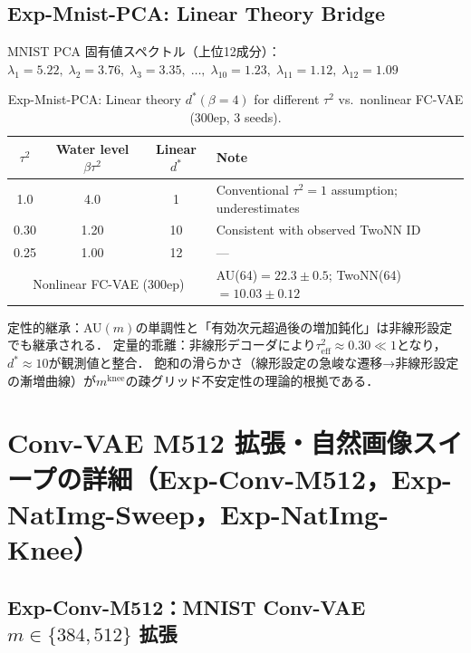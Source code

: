 \documentclass[11pt,a4paper]{jsarticle}
\newcommand{\mknee}{m^{\mathrm{knee}}}
\begin{document}
\subsection*{Exp-Mnist-PCA: Linear Theory Bridge}

MNIST PCA 固有値スペクトル（上位12成分）：
$\lambda_1=5.22,\; \lambda_2=3.76,\; \lambda_3=3.35,\;\ldots,\;\lambda_{10}=1.23,\; \lambda_{11}=1.12,\; \lambda_{12}=1.09$

\begin{table}[H]
\centering
\caption{Exp-Mnist-PCA: Linear theory $d^*(\beta=4)$ for different $\tau^2$ vs.\ nonlinear FC-VAE (300ep, 3 seeds).}
\label{tab:theory_pred}
\small
\begin{tabular}{ccc|l}
\toprule
$\tau^2$ & Water level $\beta\tau^2$ & Linear $d^*$ & Note \\
\midrule
1.0  & 4.0  & 1   & Conventional $\tau^2=1$ assumption; underestimates \\
0.30 & 1.20 & 10  & Consistent with observed TwoNN ID \\
0.25 & 1.00 & 12  & --- \\
\midrule
\multicolumn{3}{c|}{Nonlinear FC-VAE (300ep)} & AU(64)$=22.3\pm0.5$; TwoNN(64)$=10.03\pm0.12$ \\
\bottomrule
\end{tabular}
\end{table}

定性的継承：AU$(m)$の単調性と「有効次元超過後の増加鈍化」は非線形設定でも継承される．
定量的乖離：非線形デコーダにより$\tau^2_\mathrm{eff} \approx 0.30 \ll 1$となり，$d^* \approx 10$が観測値と整合．
飽和の滑らかさ（線形設定の急峻な遷移→非線形設定の漸増曲線）が$\mknee$の疎グリッド不安定性の理論的根拠である．

\section{Conv-VAE M512 拡張・自然画像スイープの詳細（Exp-Conv-M512，Exp-NatImg-Sweep，Exp-NatImg-Knee）}\label{app:convvae_natimg}

\subsection*{Exp-Conv-M512：MNIST Conv-VAE $m \in \{384, 512\}$ 拡張}
\end{document}
